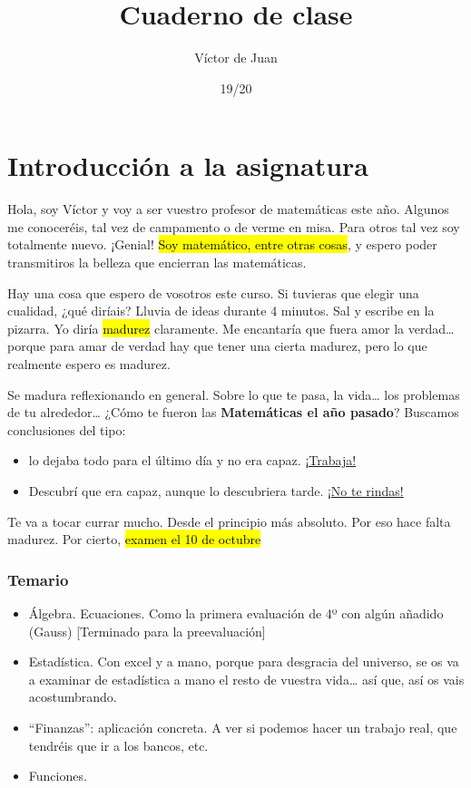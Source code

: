 \documentclass[palatino,nosec]{Docencia}
\title{Cuaderno de clase}
\author{Víctor de Juan}
\date{19/20}
\begin{document}
\pagestyle{plain}
\maketitle
\tableofcontents



\chapter{Introducción a la asignatura}


Hola, soy Víctor y voy a ser vuestro profesor de matemáticas este año. Algunos me conoceréis, tal vez de campamento o de verme en misa. Para otros tal vez soy totalmente nuevo. ¡Genial! \hl{Soy matemático, entre otras cosas}, y espero poder transmitiros la belleza que encierran las matemáticas.

Hay una cosa que espero de vosotros este curso.  Si tuvieras que elegir una cualidad, ¿qué diríais? Lluvia de ideas durante 4 minutos. Sal y escribe en la pizarra. Yo diría \hl{madurez} claramente. Me encantaría que fuera amor la verdad… porque para amar de verdad hay que tener una cierta madurez, pero lo que realmente espero es madurez.

Se madura reflexionando en general. Sobre lo que te pasa, la vida… los problemas de tu alrededor…  ¿Cómo te fueron las \textbf{Matemáticas el año pasado}? Buscamos conclusiones del tipo: 
\begin{itemize}
	\item lo dejaba todo para el último día y no era capaz. \ul{¡Trabaja!}
	\item Descubrí que era capaz, aunque lo descubriera tarde. \ul{¡No te rindas!}
\end{itemize}

Te va a tocar currar mucho. Desde el principio más absoluto. Por eso hace falta madurez. Por cierto, \hl{examen el 10 de octubre}

\subsection{Temario}

\begin{itemize}
	\item Álgebra. Ecuaciones. Como la primera evaluación de 4º con algún añadido (Gauss) [Terminado para la preevaluación]
	\item Estadística. Con excel y a mano, porque para desgracia del universo, se os va a examinar de estadística a mano el resto de vuestra vida… así que, así os vais acostumbrando.
	\item “Finanzas”: aplicación concreta. A ver si podemos hacer un trabajo real, que tendréis que ir a los bancos, etc. 
	\item Funciones.
\end{itemize}
\end{document}
